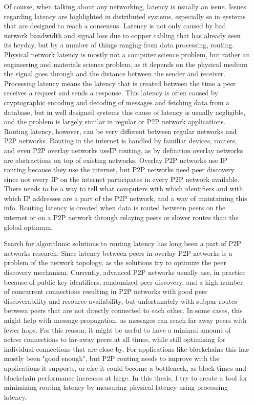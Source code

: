 Of course, when talking about any networking, latency is usually an issue. Issues regarding latency are highlighted in distributed systems, especially so in systems that are designed to reach a consensus. Latency is not only caused by bad network bandwidth and signal loss due to copper cabling that has already seen its heyday, but by a number of things ranging from data processing, routing. Physical network latency is mostly not a computer science problem, but rather an engineering and materials science problem, as it depends on the physical medium the signal goes through and the distance between the sender and receiver. Processing latency means the latency that is created between the time a peer receives a request and sends a response. This latency is often caused by cryptographic encoding and decoding of messages and fetching data from a database, but in well designed systems this cause of latency is usually negligible, and the problem is largely similar in regular or P2P network applications. Routing latency, however, can be very different between regular networks and P2P networks. Routing in the internet is handled by familiar devices, routers, and even P2P overlay networks useIP routing, as by definition overlay networks are abstractions on top of existing networks. Overlay P2P networks use IP routing because they use the internet, but P2P networks need peer discovery since not every IP on the internet participates in every P2P network available. There needs to be a way to tell what computers with which identifiers and with which IP addresses are a part of the P2P network, and a way of maintaining this info. Routing latency is created when data is routed between peers on the internet or on a P2P network through relaying peers or slower routes than the global optimum.

Search for algorithmic solutions to routing latency has long been a part of P2P networks research. Since latency between peers in overlay P2P networks is a problem of the network topology, as  the solutions try to optimize the peer discovery mechanism. Currently, advanced P2P networks usually use, in practice because of public key identifiers, randomized peer discovery, and a high number of concurrent connections resulting in P2P networks with good peer discoverability and resource availability, but unfortunately with subpar routes between peers that are not directly connected to each other. In some cases, this might help with message propagation, as messages can reach far-away peers with fewer hops. For this reason, it might be useful to have a minimal amount of active connections to far-away peers at all times, while still optimizing for individual connections that are close-by. For applications like blockchains this has mostly been "good enough", but P2P routing needs to improve with the applications it supports, or else it could become a bottleneck, as block times and blockchain performance increases at large. In this thesis, I try to create a tool for minimizing routing latency by measuring physical latency using processing latency.

